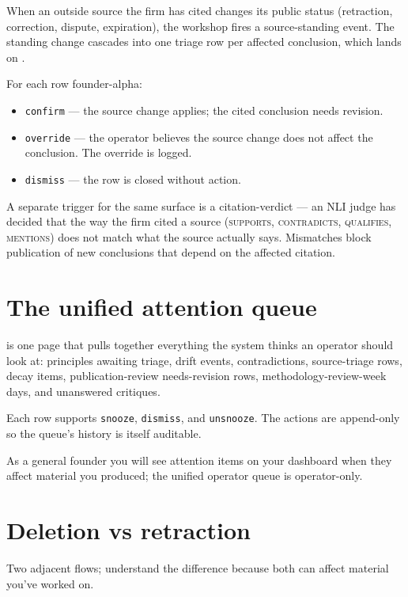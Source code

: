 \documentclass[11pt]{article}
\begin{document}
When an outside source the firm has cited changes its public status
(retraction, correction, dispute, expiration), the workshop fires a
source-standing event. The standing change cascades into one triage
row per affected conclusion, which lands on .

For each row founder-alpha:

\begin{itemize}[leftmargin=*,itemsep=0.2em]
  \item \texttt{confirm} --- the source change applies; the cited
        conclusion needs revision.
  \item \texttt{override} --- the operator believes the source change
        does not affect the conclusion. The override is logged.
  \item \texttt{dismiss} --- the row is closed without action.
\end{itemize}

A separate trigger for the same surface is a citation-verdict --- an
NLI judge has decided that the way the firm cited a source
(\textsc{supports}, \textsc{contradicts}, \textsc{qualifies},
\textsc{mentions}) does not match what the source actually says.
Mismatches block publication of new conclusions that depend on the
affected citation.

\section{The unified attention queue}

 is one page that pulls together everything the
system thinks an operator should look at: principles awaiting triage,
drift events, contradictions, source-triage rows, decay items,
publication-review needs-revision rows, methodology-review-week days,
and unanswered critiques.

Each row supports \texttt{snooze}, \texttt{dismiss}, and
\texttt{unsnooze}. The actions are append-only so the queue's history
is itself auditable.

As a general founder you will see attention items on your dashboard
when they affect material you produced; the unified operator queue
is operator-only.

\section{Deletion vs retraction}

Two adjacent flows; understand the difference because both can affect
material you've worked on.
\end{document}
